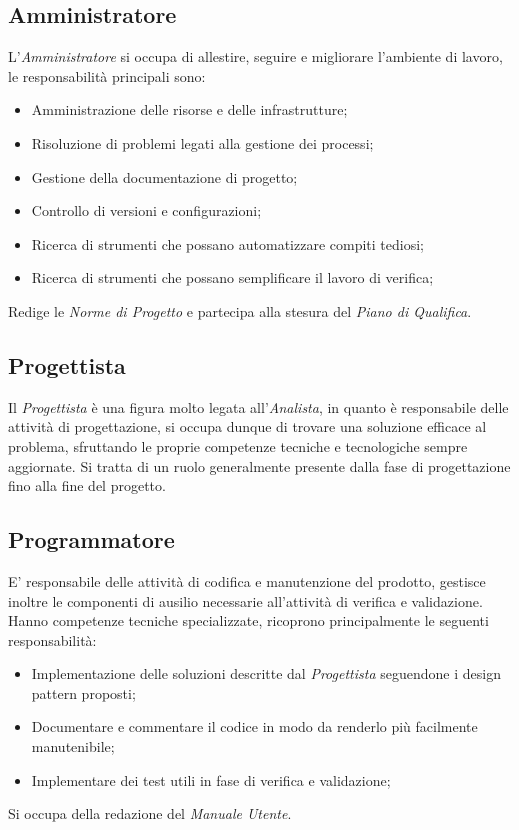 \documentclass{scalatekids-article}
\begin{document}
\subsection{Amministratore}
L'\textit{Amministratore} si occupa di allestire, seguire e migliorare
l'ambiente di lavoro, le responsabilità principali sono:
\begin{itemize}
  \item Amministrazione delle risorse e delle infrastrutture;
  \item Risoluzione di problemi legati alla gestione dei processi;
  \item Gestione della documentazione di progetto;
  \item Controllo di versioni e configurazioni;
  \item Ricerca di strumenti che possano automatizzare compiti tediosi;
  \item Ricerca di strumenti che possano semplificare il lavoro di verifica;
\end{itemize}
Redige le \textit{Norme di Progetto} e partecipa alla stesura del \textit{Piano
  di Qualifica}.
\subsection{Progettista}
Il \textit{Progettista} è una figura molto legata all'\textit{Analista}, in
quanto è responsabile delle attività di progettazione, si occupa dunque di
trovare una soluzione efficace al problema, sfruttando le proprie competenze
tecniche e tecnologiche sempre aggiornate. Si tratta di un ruolo generalmente
presente dalla fase di progettazione fino alla fine del progetto.
\subsection{Programmatore}
E' responsabile delle attività di codifica e manutenzione del prodotto, gestisce
inoltre le componenti di ausilio necessarie all'attività di verifica e
validazione. Hanno competenze tecniche specializzate, ricoprono principalmente
le seguenti responsabilità:
\begin{itemize}
  \item Implementazione delle soluzioni descritte dal \textit{Progettista}
    seguendone i design pattern proposti;
  \item Documentare e commentare il codice in modo da renderlo più facilmente
    manutenibile;
  \item Implementare dei test utili in fase di verifica e validazione;
\end{itemize}
Si occupa della redazione del \textit{Manuale Utente}.
\end{document}
